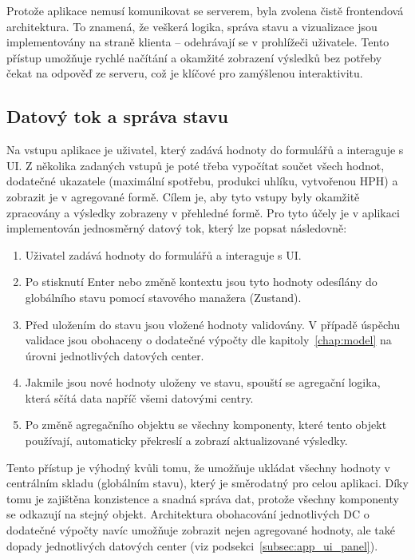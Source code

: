 Protože aplikace nemusí komunikovat se serverem, byla zvolena čistě frontendová architektura. To znamená, že veškerá logika, správa stavu a vizualizace jsou implementovány na straně klienta -- odehrávají se v prohlížeči uživatele. Tento přístup umožňuje rychlé načítání a okamžité zobrazení výsledků bez potřeby čekat na odpověď ze serveru, což je klíčové pro zamýšlenou interaktivitu.

\subsection{Datový tok a správa stavu}
\label{subsec:app_architektura_data}

Na vstupu aplikace je uživatel, který zadává hodnoty do formulářů a interaguje s UI. Z několika zadaných vstupů je poté třeba vypočítat součet všech hodnot, dodatečné ukazatele (maximální spotřebu, produkci uhlíku, vytvořenou HPH) a zobrazit je v agregované formě. Cílem je, aby tyto vstupy byly okamžitě zpracovány a výsledky zobrazeny v přehledné formě. Pro tyto účely je v aplikaci implementován jednosměrný datový tok, který lze popsat následovně:

\begin{enumerate}
	
	\item Uživatel zadává hodnoty do formulářů a interaguje s UI.
	
	\item Po stisknutí Enter nebo změně kontextu jsou tyto hodnoty odesílány do globálního stavu pomocí stavového manažera (Zustand).
	
	\item Před uložením do stavu jsou vložené hodnoty validovány. V případě úspěchu validace jsou obohaceny o dodatečné výpočty dle kapitoly~\ref{chap:model} na úrovni jednotlivých datových center.
	
	\item Jakmile jsou nové hodnoty uloženy ve stavu, spouští se agregační logika, která sčítá data napříč všemi datovými centry.
	
	\item Po změně agregačního objektu se všechny komponenty, které tento objekt používají, automaticky překreslí a zobrazí aktualizované výsledky.

\end{enumerate}

Tento přístup je výhodný kvůli tomu, že umožňuje ukládat všechny hodnoty v centrálním skladu (globálním stavu), který je směrodatný pro celou aplikaci. Díky tomu je zajištěna konzistence a snadná správa dat, protože všechny komponenty se odkazují na stejný objekt. Architektura obohacování jednotlivých DC o dodatečné výpočty navíc umožňuje zobrazit nejen agregované hodnoty, ale také dopady jednotlivých datových center (viz podsekci~\ref{subsec:app_ui_panel}).

